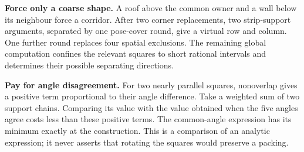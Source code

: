 \documentclass[11pt]{article}
\begin{document}
\textbf{Force only a coarse shape.} A roof above the common owner and a
wall below its neighbour force a corridor. After two corner replacements,
two strip-support arguments, separated by one pose-cover round, give a
virtual row and column. One further round replaces four spatial exclusions.
The remaining global computation confines the relevant squares to short
rational intervals and determines their possible separating directions.

\textbf{Pay for angle disagreement.} For two nearly parallel squares,
nonoverlap gives a positive term proportional to their angle difference.
Take a weighted sum of two support chains. Comparing its value with the
value obtained when the five angles agree costs less than these positive
terms. The common-angle expression has its minimum exactly at the
construction. This is a comparison of an analytic expression; it never
asserts that rotating the squares would preserve a packing.
\end{document}
